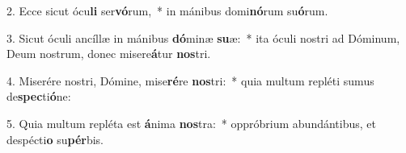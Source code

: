 2. Ecce sicut ócu\textbf{li} ser\textbf{vó}rum,~*  in mánibus domi\textbf{nó}rum su\textbf{ó}rum.\

3. Sicut óculi ancíllæ in mánibus \textbf{dó}minæ \textbf{su}æ:~*  ita óculi nostri ad Dóminum, Deum nostrum, donec misere\textbf{á}tur \textbf{nos}tri.\

4. Miserére nostri, Dómine, mise\textbf{ré}re \textbf{nos}tri:~*  quia multum repléti sumus de\textbf{spec}ti\textbf{ó}ne:\

5. Quia multum repléta est \textbf{á}nima \textbf{nos}tra:~*  oppróbrium abundántibus, et despécti\textbf{o} su\textbf{pér}bis.\

